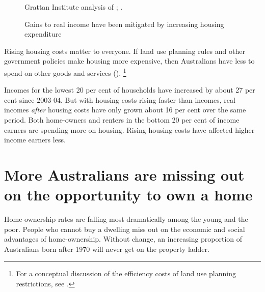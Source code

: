 \begin{figure}
\caption{Gains to real income have been mitigated by increasing housing expenditure }\label{fig:rising-housing-costs-eating-income-growth}
{Grattan Institute analysis of \textcites{ABS-HES-201516-Microdata}{ABS-HES-200304-Microdata}; \textcite{ABS-2017-HouseholdIncomeAndWealth-201516}.}
\end{figure}

Rising housing costs matter to everyone.
If land use planning rules and other government policies make housing more expensive, then Australians have less to spend on other goods and services ().%
    \footnote{For a conceptual discussion of the efficiency costs of land use planning restrictions, see \textcite{GlaeserGyourko2017EconImplications}.}

Incomes for the lowest 20 per cent of households have increased by about 27 per cent since 2003-04.
But with housing costs rising faster than incomes, real incomes \emph{after} housing costs have only grown about 16 per cent over the same period.
Both home-owners and renters in the bottom 20 per cent of income earners are spending more on housing.
Rising housing costs have affected higher income earners less. 


\section{More Australians are missing out on the opportunity to own a home}\label{sec:falling-home-ownership-rates-are-depriving-more-people-of-the-benefits-of-owning-a-home}

Home-ownership rates are falling most dramatically among the young and the poor.
People who cannot buy a dwelling miss out on the economic and social advantages of home-ownership.
Without change, an increasing proportion of Australians born after 1970 will never get on the property ladder.

